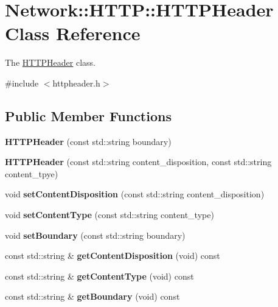 \hypertarget{classNetwork_1_1HTTP_1_1HTTPHeader}{}\section{Network\+:\+:H\+T\+TP\+:\+:H\+T\+T\+P\+Header Class Reference}
\label{classNetwork_1_1HTTP_1_1HTTPHeader}


The \hyperlink{classNetwork_1_1HTTP_1_1HTTPHeader}{H\+T\+T\+P\+Header} class.  




{\ttfamily \#include $<$httpheader.\+h$>$}

\subsection*{Public Member Functions}
\begin{DoxyCompactItemize}
\item 
\mbox{\label{classNetwork_1_1HTTP_1_1HTTPHeader_a56358fa12bd27707de8ad6cf947cd92d}} 
{\bfseries H\+T\+T\+P\+Header} (const std\+::string boundary)
\item 
\mbox{\label{classNetwork_1_1HTTP_1_1HTTPHeader_a6100fd84766656e8874479a75d494ba1}} 
{\bfseries H\+T\+T\+P\+Header} (const std\+::string content\+\_\+disposition, const std\+::string content\+\_\+tpye)
\item 
\mbox{\label{classNetwork_1_1HTTP_1_1HTTPHeader_a1b488bbabdf4037e6dc58655f2f9dc91}} 
void {\bfseries set\+Content\+Disposition} (const std\+::string content\+\_\+disposition)
\item 
\mbox{\label{classNetwork_1_1HTTP_1_1HTTPHeader_a8d90949a97d4d019cbce3affabf2daf7}} 
void {\bfseries set\+Content\+Type} (const std\+::string content\+\_\+type)
\item 
\mbox{\label{classNetwork_1_1HTTP_1_1HTTPHeader_a056752befb5b801c1193b9e940d92e94}} 
void {\bfseries set\+Boundary} (const std\+::string boundary)
\item 
\mbox{\label{classNetwork_1_1HTTP_1_1HTTPHeader_a0f05d5b3073374318284ea1b667dc183}} 
const std\+::string \& {\bfseries get\+Content\+Disposition} (void) const
\item 
\mbox{\label{classNetwork_1_1HTTP_1_1HTTPHeader_a2f4f982ef8eb3de60e75d3cee7cc21f1}} 
const std\+::string \& {\bfseries get\+Content\+Type} (void) const
\item 
\mbox{\label{classNetwork_1_1HTTP_1_1HTTPHeader_a869ed7b4658bcdb1aec32354a90e1f86}} 
const std\+::string \& {\bfseries get\+Boundary} (void) const
\end{DoxyCompactItemize}
